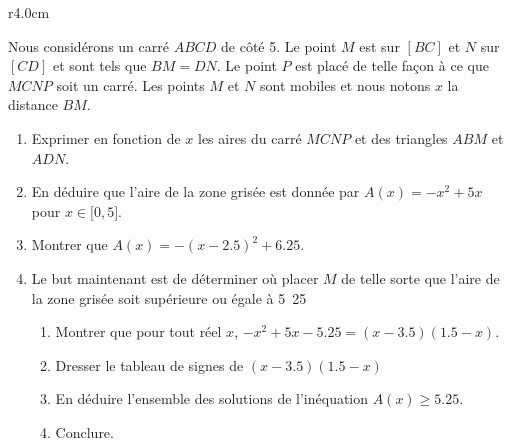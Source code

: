 
\begin{exercice}\label{exosmath-0654}

\begin{wrapfigure}{r}{4.0cm}
   \vspace{-0.5cm}        %
   \centering
   
\end{wrapfigure}


    Nous considérons un carré \( ABCD\) de côté \unit{5}{\centi\meter}. Le point \( M\) est sur \( [BC]\) et \( N\) sur \( [CD]\) et sont tels que \( BM=DN\). Le point \( P\) est placé de telle façon à ce que \( MCNP\) soit un carré. Les points \( M\) et \( N\) sont mobiles et nous notons \( x\) la distance \( BM\).

    \begin{enumerate}
        \item
            Exprimer en fonction de \( x\) les aires du carré \( MCNP\) et des triangles \( ABM\) et \( ADN\).
        \item
            En déduire que l'aire de la zone grisée est donnée par \( A(x)=-x^2+5x\) pour \( x\in\mathopen[ 0 , 5 \mathclose]\).
        \item
            Montrer que \( A(x)=-(x-2.5)^2+6.25\).
        \item
            Le but maintenant est de déterminer où placer \( M\) de telle sorte que l'aire de la zone grisée soit supérieure ou égale à \unit{5.25}{\centi\meter\squared}
            \begin{enumerate}
                \item
                    Montrer que pour tout réel \( x\), \( -x^2+5x-5.25=(x-3.5)(1.5-x)\).
                \item
                    Dresser le tableau de signes de \( (x-3.5)(1.5-x)\)
                \item
                    En déduire l'ensemble des solutions de l'inéquation \( A(x)\geq 5.25\).
                \item
                    Conclure.
            \end{enumerate}
    \end{enumerate}

\end{exercice}
